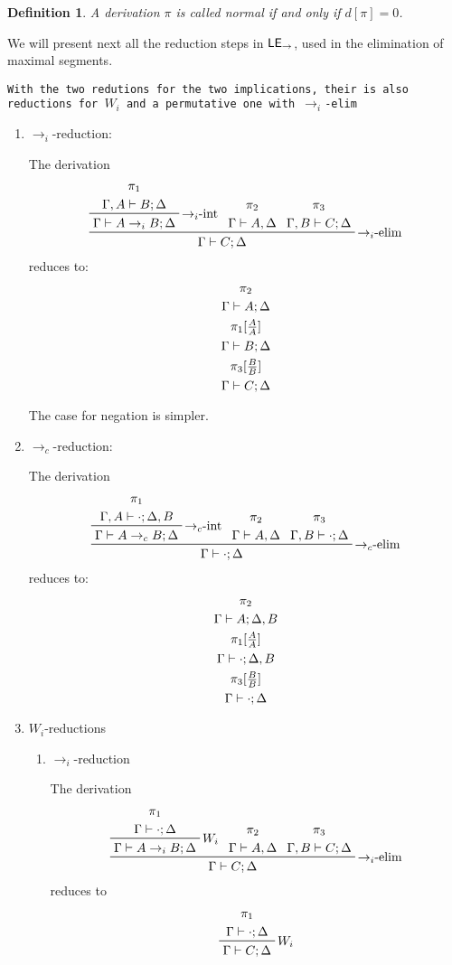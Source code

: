\documentclass{article}
\newcommand{\lei}{$\text{\sffamily{LE}}_{\to}$}
\newcommand{\efc}{$\to_c$-elim}
\newcommand{\efi}{$\to_i$-elim}
\newcommand{\ifc}{$\to_c$-int}
\newcommand{\ifi}{$\to_i$-int}
\newcommand{\comp}[1]{[\tfrac{#1}{#1}]}
\newtheorem{definition}{Definition}[section]
\begin{document}
\begin{definition}
  A derivation $\pi$ is called \emph{normal} if and only if $d[\pi]=0$.
\end{definition}

We will present next all the reduction steps in \lei{}, used in the elimination of maximal segments.

\texttt{With the two redutions for the two implications, their is also reductions for $W_i$ and a permutative one with \efi{}}

\begin{enumerate}
\item $\to_i$-reduction:

  The derivation
  \[\prftree[r]{\efi{}}{
      \prftree[r]{\ifi{}}{
        \prftree[noline]{\pi_1}{\Gamma, A\vdash B; \Delta}}{
        \Gamma\vdash A\to_i B; \Delta}}{
      \prftree[noline]{\pi_2}{\Gamma\vdash A, \Delta}}{
      \prftree[noline]{\pi_3}{\Gamma, B\vdash C; \Delta}}{
      \Gamma\vdash C; \Delta}\]
  reduces to:
  \[\prftree[noline]{\prftree[noline]{\prftree[noline]{\prftree[noline]{\prftree[noline]{
              \pi_2}{
              \Gamma\vdash A; \Delta}}{
            \pi_1\comp{A}}}{
          \Gamma\vdash B; \Delta}}{
        \pi_3\comp{B}}}{
      \Gamma\vdash C;\Delta}\]

  The case for negation is simpler.
\item $\to_c$-reduction:

  The derivation
  \[\prftree[r]{\efc{}}{
      \prftree[r]{\ifc{}}{
        \prftree[noline]{\pi_1}{\Gamma, A\vdash \cdot; \Delta, B}}{
        \Gamma\vdash A\to_c B; \Delta}}{
      \prftree[noline]{\pi_2}{\Gamma\vdash A, \Delta}}{
      \prftree[noline]{\pi_3}{\Gamma, B\vdash \cdot; \Delta}}{
      \Gamma\vdash \cdot; \Delta}\]
  reduces to:
  \[\prftree[noline]{\prftree[noline]{\prftree[noline]{\prftree[noline]{\prftree[noline]{
              \pi_2}{
              \Gamma\vdash A; \Delta, B}}{
            \pi_1\comp{A}}}{
          \Gamma\vdash \cdot; \Delta, B}}{
        \pi_3\comp{B}}}{
      \Gamma\vdash \cdot;\Delta}\]
  \ttfamily{}
\item $W_i$-reductions
  \begin{enumerate}
  \item $\to_i$-reduction

    The derivation
    \[\prftree[r]{\efi{}}{
        \prftree[r]{$W_i$}{
          \prftree[noline]{\pi_1}{\Gamma\vdash \cdot; \Delta}}{
          \Gamma\vdash A\to_i B; \Delta}}{
        \prftree[noline]{\pi_2}{\Gamma\vdash A, \Delta}}{
        \prftree[noline]{\pi_3}{\Gamma, B\vdash C; \Delta}}{
        \Gamma\vdash C; \Delta}\]
    reduces to
    \[\prftree[r]{$W_i$}{\prftree[noline]{
          \pi_1}{
          \Gamma\vdash\cdot; \Delta}}{
        \Gamma\vdash C; \Delta}\]
    

\end{enumerate}
\end{enumerate}
\end{document}
